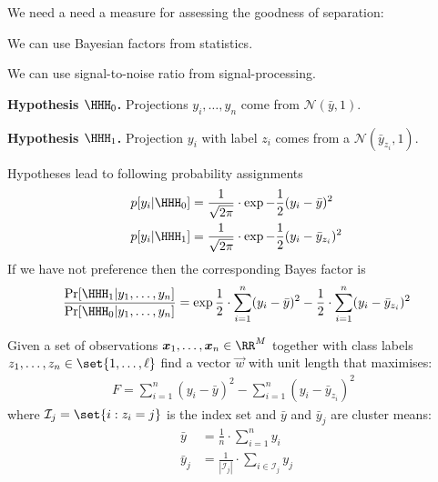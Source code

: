 \documentclass[landscape,footrule]{foils}
\begin{document}


We need a need a  measure for assessing the goodness of separation: 
\begin{triangles}
\item We can use Bayesian factors from statistics.
\item We can use signal-to-noise ratio from signal-processing.
\end{triangles}


\begin{triangles}
\item \textbf{Hypothesis $\HHH_0$.} Projections $y_i,\ldots, y_n$ come from $\mathcal{N}(\bar{y}, 1)$.
\item \textbf{Hypothesis $\HHH_1$.} Projection $y_i$ with label $z_i$ comes from a $\mathcal{N}(\bar{y}_{z_i},1)$.\vspace*{2ex}
\end{triangles}

Hypotheses lead to following probability assignments
\begin{align*}
p[y_i|\HHH_0]&=\frac{1}{\sqrt{2\pi}}\cdot \exp{-\frac{1}{2}(y_i-\bar{y})^2}\\
p[y_i|\HHH_1]&=\frac{1}{\sqrt{2\pi}}\cdot \exp{-\frac{1}{2}(y_i-\bar{y}_{z_i})^2}
\end{align*}
If we have not preference then the corresponding Bayes factor is
\begin{align*}
\frac{\Pr[\HHH_1|y_1,\ldots,y_n]}{\Pr[\HHH_0|y_1,\ldots,y_n]}= 
\exp{\frac{1}{2}\cdot\sum_{i=1}^n(y_i-\bar{y})^2-\frac{1}{2}\cdot\sum_{i=1}^n(y_i-\bar{y}_{z_i})^2}
\end{align*}


Given a set of observations $\vec{x}_1,\ldots,\vec{x}_n\in\RR^M$ together with class labels $z_1,\ldots,z_n\in\set{1,\ldots,\ell}$ find a vector $\vec{w}$ with unit length that maximises:
\begin{align*}
F=\sum_{i=1}^n(y_i-\bar{y})^2-\sum_{i=1}^n(y_i-\bar{y}_{z_i})^2\enspace
\end{align*}
where $\mathcal{I}_j=\set{i: z_i=j}$ is the index set and $\bar{y}$ and $\bar{y}_{j}$ are cluster means: 
\begin{align*}
\bar{y}&=\frac{1}{n}\cdot\sum_{i=1}^n y_i \\
\bar{y}_j&=\frac{1}{|\mathcal{I}_j|}\cdot\sum_{i\in\mathcal{I}_j} y_j 
\end{align*}
\end{document}
